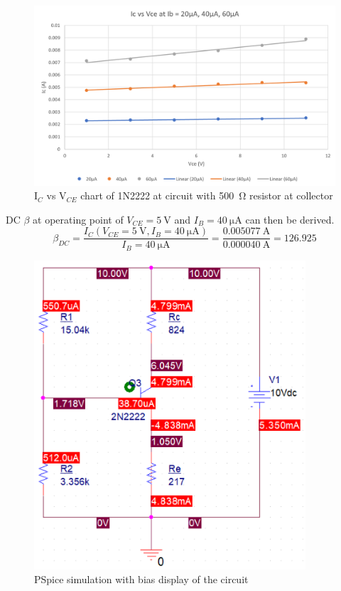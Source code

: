 \documentclass{article}
\begin{document}
\begin{figure}[H]
  \centering
  \includegraphics[width=\textwidth]{ECE2200L_Lab5_IV_part2.png}
  \caption{I$_C$ vs V$_{CE}$ chart of 1N2222 at circuit with \SI{500}{\ohm} resistor at collector}
  \label{fig:IV2}
\end{figure}

DC $\beta$ at operating point of $V_{CE} = \SI{5}{\volt}$ and $I_{B} = \SI{40}{\micro\ampere}$ can then be derived.
\begin{equation} \label{eqn1}
  \beta_{DC} = \frac{I_C(V_{CE} = \SI{5}{\volt},I_{B} = \SI{40}{\micro\ampere})}{I_{B} = \SI{40}{\micro\ampere}} = \frac{\SI{0.005077}{\ampere}}{\SI{0.000040}{\ampere}}=126.925
\end{equation} 
\newpage

\begin{figure}[H]
  \centering
  \includegraphics[width=0.9\textwidth]{ECE2200L_Lab5_PSpice.png}
  \caption{PSpice simulation with bias display of the circuit}
  \label{fig:IV2}
\end{figure}
\end{document}
